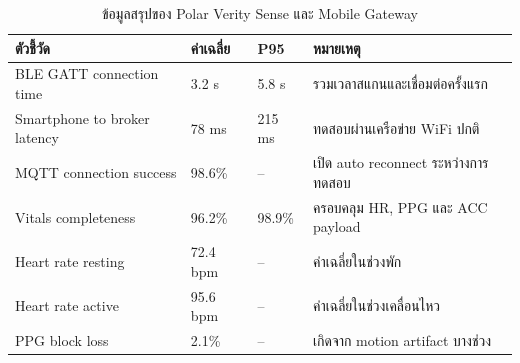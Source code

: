 \begin{table}[H]
    \centering
    \caption{ข้อมูลสรุปของ Polar Verity Sense และ Mobile Gateway}
    \label{tab:app_sensor_mobile_gateway}
    \renewcommand{\arraystretch}{1.18}
    \small
    \setlength{\tabcolsep}{3pt}
    \begin{tabular}{|L{0.34\textwidth}|L{0.15\textwidth}|L{0.15\textwidth}|L{0.25\textwidth}|}
        \hline
        \textbf{ตัวชี้วัด} & \textbf{ค่าเฉลี่ย} & \textbf{P95} & \textbf{หมายเหตุ} \\ \hline
        BLE GATT connection time & 3.2 s & 5.8 s & รวมเวลาสแกนและเชื่อมต่อครั้งแรก \\ \hline
        Smartphone to broker latency & 78 ms & 215 ms & ทดสอบผ่านเครือข่าย WiFi ปกติ \\ \hline
        MQTT connection success & 98.6\% & -- & เปิด auto reconnect ระหว่างการทดสอบ \\ \hline
        Vitals completeness & 96.2\% & 98.9\% & ครอบคลุม HR, PPG และ ACC payload \\ \hline
        Heart rate resting & 72.4 bpm & -- & ค่าเฉลี่ยในช่วงพัก \\ \hline
        Heart rate active & 95.6 bpm & -- & ค่าเฉลี่ยในช่วงเคลื่อนไหว \\ \hline
        PPG block loss & 2.1\% & -- & เกิดจาก motion artifact บางช่วง \\ \hline
    \end{tabular}
\end{table}
